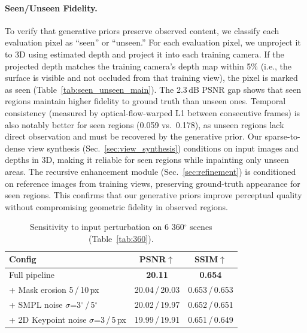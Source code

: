 \documentclass[acmtog]{acmart}
\newcommand{\degree}{$^\circ$}
\begin{document}
\paragraph{Seen/Unseen Fidelity.}
To verify that generative priors preserve observed content, we classify each evaluation pixel as ``seen'' or ``unseen.'' For each evaluation pixel, we unproject it to 3D using estimated depth and project it into each training camera. If the projected depth matches the training camera's depth map within 5\% (i.e., the surface is visible and not occluded from that training view), the pixel is marked as seen (Table~\ref{tab:seen_unseen_main}).
The 2.3\,dB PSNR gap shows that seen regions maintain higher fidelity to ground truth than unseen ones. Temporal consistency (measured by optical-flow-warped L1 between consecutive frames) is also notably better for seen regions (0.059 vs.\ 0.178), as unseen regions lack direct observation and must be recovered by the generative prior.
Our sparse-to-dense view synthesis (Sec.~\ref{sec:view_synthesis}) conditions on input images and depths in 3D, making it reliable for seen regions while inpainting only unseen areas. The recursive enhancement module (Sec.~\ref{sec:refinement}) is conditioned on reference images from training views, preserving ground-truth appearance for seen regions. This confirms that our generative priors improve perceptual quality without compromising geometric fidelity in observed regions.


\begin{table}[t]
\centering
%
\caption{Sensitivity to input perturbation on 6 360\degree{} scenes (Table~\ref{tab:360}).}
%
\label{tab:robustness_main}
\begin{tabular}{l|cc}
\toprule
Config & PSNR$\uparrow$ & SSIM$\uparrow$ \\
\midrule
Full pipeline & \textbf{20.11} & \textbf{0.654} \\
\midrule
+ Mask erosion 5\,/\,10\,px & 20.04\,/\,20.03 & 0.653\,/\,0.653 \\
+ SMPL noise $\sigma$=3\degree\,/\,5\degree & 20.02\,/\,19.97 & 0.652\,/\,0.651 \\
+ 2D Keypoint noise $\sigma$=3\,/\,5\,px & 19.99\,/\,19.91 & 0.651\,/\,0.649 \\
\bottomrule
\end{tabular}
%
\end{table}
\end{document}
